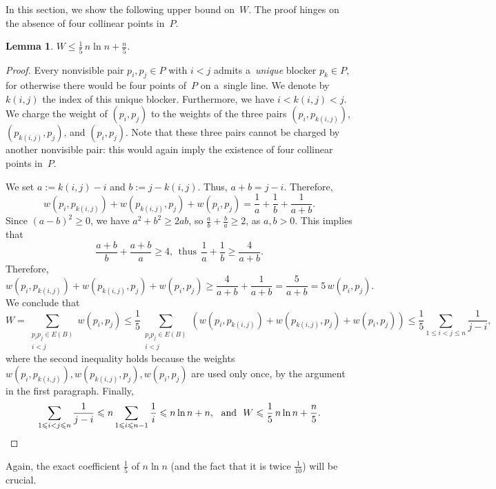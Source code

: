 \documentclass[11pt,a4paper]{article}
\let\qedhere\relax
\newtheorem{lemma}{Lemma}
\begin{document}
In this section, we show the following upper bound on~$W$.
The proof hinges on the absence of four collinear points in~$P$.

\begin{lemma}\label{lem:ub-W}
  $W \leqslant \frac{1}{5}\,n \ln n + \frac{n}{5}$.
\end{lemma}

\begin{proof}
  Every nonvisible pair $p_i, p_j \in P$ with $i < j$ admits a~\emph{unique} blocker $p_k \in P$, for otherwise there would be four points of~$P$ on a~single line.
  We denote by $k(i,j)$ the index of this unique blocker.
  Furthermore, we have $i < k(i,j) < j$.
  We charge the weight of $(p_i, p_j)$ to the weights of the three pairs $(p_i, p_{k(i,j)})$, $(p_{k(i,j)}, p_j)$, and $(p_i, p_j)$.
  Note that these three pairs cannot be charged by another nonvisible pair: this would again imply the existence of four collinear points in~$P$.

  We set $a := k(i,j) - i$ and $b := j - k(i,j)$.
  Thus, $a+b = j - i$.
  Therefore, \[w(p_i,p_{k(i,j)})+w(p_{k(i,j)},p_j)+w(p_i,p_j) = \frac{1}{a} + \frac{1}{b} + \frac{1}{a+b}.\]
  Since $(a-b)^2 \geqslant 0$, we have $a^2+b^2 \geqslant 2ab$, so $\frac{a}{b} + \frac{b}{a} \geqslant 2$, as $a, b > 0$.
  This implies that \[\frac{a+b}{b} + \frac{a+b}{a} \geqslant 4,~~\text{thus}~~\frac{1}{a} + \frac{1}{b} \geqslant \frac{4}{a+b}.\]
  Therefore,
  \[w(p_i,p_{k(i,j)})+w(p_{k(i,j)},p_j)+w(p_i,p_j) \geqslant \frac{4}{a+b} + \frac{1}{a+b} = \frac{5}{a+b} = 5\,w(p_i,p_j).\]
  We conclude that
  \[W = \sum\limits_{\substack{p_ip_j \in E(B)\\i<j}} w(p_i,p_j) \leqslant \frac{1}{5} \sum\limits_{\substack{p_ip_j \in E(B)\\i<j}} \left(w(p_i,p_{k(i,j)})+w(p_{k(i,j)},p_j)+w(p_i,p_j)\right) \leqslant \frac{1}{5} \sum\limits_{1 \leqslant i < j \leqslant n} \frac{1}{j-i},\]
  where the second inequality holds because the weights $w(p_i,p_{k(i,j)}), w(p_{k(i,j)},p_j), w(p_i,p_j)$ are used only once, by the argument in the first paragraph.
  Finally,
  \[\sum\limits_{1 \leqslant i < j \leqslant n} \frac{1}{j-i} \leqslant n \sum\limits_{1 \leqslant i \leqslant n-1} \frac{1}{i} \leqslant n \ln n + n,~~\text{and}~~W \leqslant \frac{1}{5}\,n \ln n + \frac{n}{5}.\qedhere\]
\end{proof}

Again, the exact coefficient $\frac{1}{5}$ of $n \ln n$ (and the fact that it is twice $\frac{1}{10}$) will be crucial. 
\end{document}
